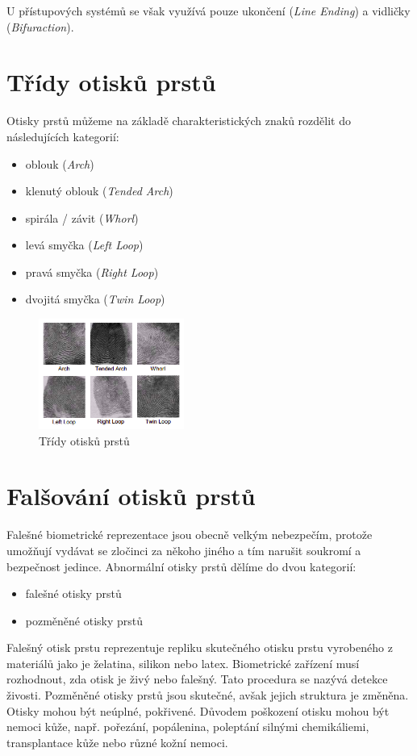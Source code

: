U přístupových systémů se však využívá pouze ukončení (\textit{Line Ending}) a vidličky (\textit{Bifuraction}). \cite{Drahansky}

\section{Třídy otisků prstů}
Otisky prstů můžeme na základě charakteristických znaků rozdělit do následujících kategorií: 
\begin{itemize}
    \item oblouk (\textit{Arch})
    \item klenutý oblouk (\textit{Tended Arch})
    \item spirála / závit (\textit{Whorl})
    \item levá smyčka (\textit{Left Loop})
    \item pravá smyčka (\textit{Right Loop})
    \item dvojitá smyčka (\textit{Twin Loop}) \cite{Drahansky}
\end{itemize}

\begin{figure}[!htbp]
    \centering
    \includegraphics[width=180px]{obrazky-figures/classes.png}
    \caption{Třídy otisků prstů \cite{Drahansky}}
\end{figure}

\section{Falšování otisků prstů}
Falešné biometrické reprezentace jsou obecně velkým nebezpečím, protože umožňují vydávat se zločinci za někoho jiného a tím narušit soukromí a bezpečnost jedince. Abnormální otisky prstů dělíme do dvou kategorií:
\begin{itemize}
    \item falešné otisky prstů
    \item pozměněné otisky prstů
\end{itemize}
Falešný otisk prstu reprezentuje repliku skutečného otisku prstu vyrobeného z materiálů jako je želatina, silikon nebo latex. Biometrické zařízení musí rozhodnout, zda otisk je živý nebo falešný. Tato procedura se nazývá detekce živosti.
Pozměněné otisky prstů jsou skutečné, avšak jejich struktura je změněna. Otisky mohou být neúplné, pokřivené. Důvodem poškození otisku mohou být nemoci kůže, např. pořezání, popálenina, poleptání silnými chemikáliemi, transplantace kůže nebo různé kožní nemoci. \cite{Petrovici}




